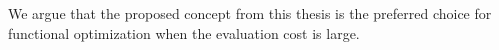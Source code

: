         We argue that the proposed concept from this thesis is the preferred choice for functional optimization when the evaluation cost is large.










